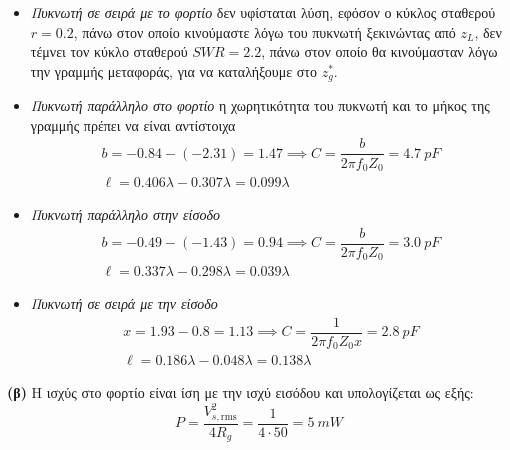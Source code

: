\documentclass[12pt]{article}
\begin{document}
\begin{itemize}
    \item \textit{Πυκνωτή σε σειρά με το φορτίο} δεν υφίσταται λύση, εφόσον ο κύκλος σταθερού $r = 0.2$, πάνω στον οποίο κινούμαστε λόγω του πυκνωτή ξεκινώντας από $z_L$, δεν τέμνει τον κύκλο σταθερού $SWR = 2.2$, πάνω στον οποίο θα κινούμασταν λόγω την γραμμής μεταφοράς, για να καταλήξουμε στο $z^*_g$.
    \item \textit{Πυκνωτή παράλληλο στο φορτίο} η χωρητικότητα του πυκνωτή και το μήκος της γραμμής πρέπει να είναι αντίστοιχα
        \begin{gather*}
            b = - 0.84 - (-2.31) = 1.47 \implies C = \dfrac{b}{2\pi f_0 Z_0} = \SI{4.7}{pF} \\
            \ell = 0.406\lambda - 0.307\lambda = 0.099\lambda
        \end{gather*}
    \item \textit{Πυκνωτή παράλληλο στην είσοδο} 
        \begin{gather*}
            b = - 0.49 - (-1.43) = 0.94 \implies C = \dfrac{b}{2\pi f_0 Z_0} = \SI{3.0}{pF} \\
            \ell = 0.337\lambda - 0.298\lambda = 0.039\lambda
        \end{gather*}
    \item \textit{Πυκνωτή σε σειρά με την είσοδο}
        \begin{gather*}
            x = 1.93 - 0.8 = 1.13 \implies C = \dfrac{1}{2\pi f_0 Z_0 x} = \SI{2.8}{pF} \\
            \ell = 0.186\lambda - 0.048\lambda = 0.138\lambda
        \end{gather*}
\end{itemize}
\textbf{(β)} H ισχύς στο φορτίο είναι ίση με την ισχύ εισόδου και υπολογίζεται ως εξής: 
\[
    P = \dfrac{V^2_{s, \text{rms}}}{4R_g} = \dfrac{1}{4\cdot 50} = \SI{5}{mW}
\]
\end{document}
